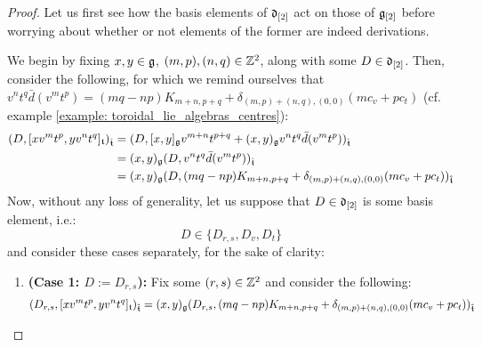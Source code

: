             \begin{proof}
                Let us first see how the basis elements of $\mathfrak{d}_{[2]}$ act on those of $\mathfrak{g}_{[2]}$ before worrying about whether or not elements of the former are indeed derivations.
            
                We begin by fixing $x, y \in \g$, $(m, p), (n, q) \in \Z^2$, along with some $D \in \d_{[2]}$. Then, consider the following, for which we remind ourselves that $v^n t^q \bar{d}(v^m t^p) = (mq - np) K_{m + n, p + q} + \delta_{(m, p) + (n, q), (0, 0)} ( m c_v + p c_t )$ (cf. example \ref{example: toroidal_lie_algebras_centres}):
                    $$
                        \begin{aligned}
                            ( D, [x v^m t^p, y v^n t^q]_{\toroidal} )_{\extendedtoroidal} & = ( D, [x, y]_{\g} v^{m + n} t^{p + q} + (x, y)_{\g} v^n t^q \bar{d}( v^m t^p ) )_{\extendedtoroidal}
                            \\
                            & = (x, y)_{\g} ( D, v^n t^q \bar{d}( v^m t^p ) )_{\extendedtoroidal}
                            \\
                            & = (x, y)_{\g} ( D, (mq - np) K_{m + n, p + q} + \delta_{(m, p) + (n, q), (0, 0)} ( m c_v + p c_t ) )_{\extendedtoroidal}
                        \end{aligned}
                    $$
                Now, without any loss of generality, let us suppose that $D \in \d_{[2]}$ is some basis element, i.e.:
                    $$D \in \{ D_{r, s}, D_v, D_t \}$$
                and consider these cases separately, for the sake of clarity:
                \begin{enumerate}
                    \item \textbf{(Case 1: $D := D_{r, s}$):} Fix some $(r, s) \in \Z^2$ and consider the following: 
                        $$
                            \begin{aligned}
                                ( D_{r, s}, [x v^m t^p, y v^n t^q]_{\toroidal} )_{\extendedtoroidal} & = (x, y)_{\g} ( D_{r, s}, (mq - np) K_{m + n, p + q} + \delta_{(m, p) + (n, q), (0, 0)} ( m c_v + p c_t ) )_{\extendedtoroidal}
                                \\

\end{aligned}$$
\end{enumerate}
\end{proof}
